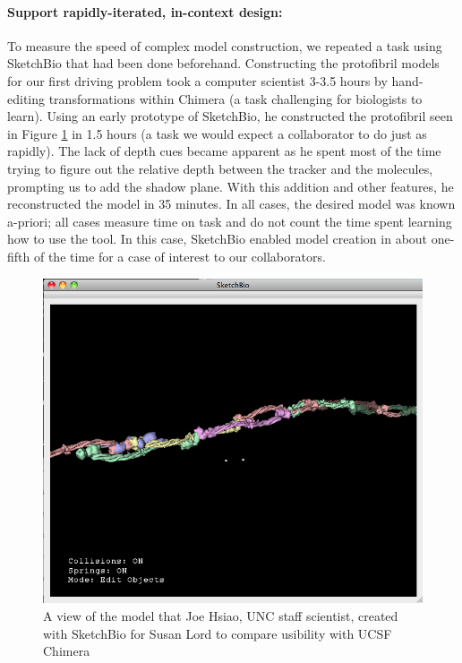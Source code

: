 \documentclass[twocolumn]{bmcart}%
\begin{document}
\paragraph*{Support rapidly-iterated, in-context design:}
To measure the speed of complex model construction, we repeated a task using SketchBio that had been done beforehand.
Constructing the protofibril models for our first driving problem took a computer scientist 3-3.5 hours by hand-editing transformations within Chimera (a task challenging for biologists to learn).
Using an early prototype of SketchBio, he constructed the protofibril seen in Figure \ref{fig:joe_test} in 1.5 hours (a task we would expect a collaborator to do just as rapidly).
The lack of depth cues became apparent as he spent most of the time trying to figure out the relative depth between the tracker and the molecules, prompting us to add the shadow plane.
With this addition and other features, he reconstructed the model in 35 minutes.
In all cases, the desired model was known a-priori; all cases measure time on task and do not count the time spent learning how to use the tool.
In this case, SketchBio enabled model creation in about one-fifth of the time for a case of interest to our collaborators.

\begin{figure}[h]
\centering
\includegraphics[width=0.9\columnwidth]{joe_test.png}
\caption{A view of the model that Joe Hsiao, UNC staff scientist, created with SketchBio for Susan Lord to compare usibility with UCSF Chimera}
\label{fig:joe_test}
\end{figure}
\end{document}

